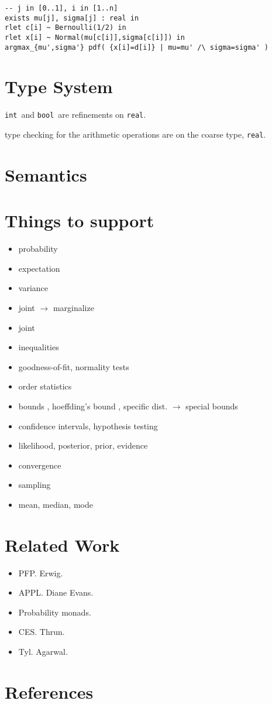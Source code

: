 \documentclass{article}
\newcommand{\T}[1]{\texttt{#1}}
\newcommand{\rbool}{\T{bool}}
\newcommand{\rint}{\T{int}}
\newcommand{\rreal}{\T{real}}
\begin{document}
\begin{verbatim}
-- j in [0..1], i in [1..n]
exists mu[j], sigma[j] : real in
rlet c[i] ~ Bernoulli(1/2) in
rlet x[i] ~ Normal(mu[c[i]],sigma[c[i]]) in
argmax_{mu',sigma'} pdf( {x[i]=d[i]} | mu=mu' /\ sigma=sigma' )
\end{verbatim}

\section{Type System}

\rint\ and \rbool\ are refinements on \rreal.

type checking for the arithmetic operations are on the coarse type, \rreal.  


\section{Semantics}

\section{Things to support}

\begin{itemize}
\item probability
\item expectation
\item variance 
\item joint $\rightarrow$ marginalize
\item joint 
\item inequalities
\item goodness-of-fit, normality tests
\item order statistics
\item bounds , hoeffding's bound , specific dist. $\rightarrow$ special bounds
\item confidence intervals, hypothesis testing
\item likelihood, posterior, prior, evidence
\item convergence
\item sampling
\item mean, median, mode
\end{itemize}

\section{Related Work}

\begin{itemize}
\item PFP. Erwig.
\item APPL. Diane Evans.
\item Probability monads.
\item CES. Thrun.
\item Tyl. Agarwal.
\end{itemize}


\section{References}
\end{document}
